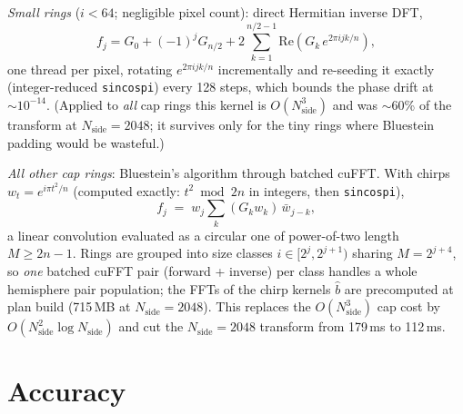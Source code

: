 \documentclass[11pt]{article}
\begin{document}
\emph{Small rings} ($i < 64$; negligible pixel count): direct Hermitian
inverse DFT,
\begin{equation}
f_j = G_0 + (-1)^j G_{n/2}
   + 2\sum_{k=1}^{n/2-1} \mathrm{Re}\!\left(G_k\, e^{2\pi i jk/n}\right),
\end{equation}
one thread per pixel, rotating $e^{2\pi i jk/n}$ incrementally and
re-seeding it exactly (integer-reduced \texttt{sincospi}) every 128 steps,
which bounds the phase drift at $\sim\!10^{-14}$.  (Applied to \emph{all}
cap rings this kernel is $O(N_\mathrm{side}^3)$ and was $\sim$60\% of the
transform at $N_\mathrm{side}=2048$; it survives only for the tiny rings
where Bluestein padding would be wasteful.)

\emph{All other cap rings}: Bluestein's algorithm through batched cuFFT.
With chirps $w_t = e^{i\pi t^2/n}$ (computed exactly: $t^2 \bmod 2n$ in
integers, then \texttt{sincospi}),
\begin{equation}
f_j \;=\; w_j \sum_{k} \left(G_k w_k\right)\, \bar w_{j-k},
\end{equation}
a linear convolution evaluated as a circular one of power-of-two length
$M \ge 2n-1$.  Rings are grouped into size classes
$i \in [2^j, 2^{j+1})$ sharing $M = 2^{j+4}$, so \emph{one} batched
cuFFT pair (forward + inverse) per class handles a whole hemisphere pair
population; the FFTs of the chirp kernels $\hat b$ are precomputed at plan
build (715\,MB at $N_\mathrm{side}=2048$).  This replaces the
$O(N_\mathrm{side}^3)$ cap cost by $O(N_\mathrm{side}^2 \log
N_\mathrm{side})$ and cut the $N_\mathrm{side}=2048$ transform from
179\,ms to 112\,ms.

\section{Accuracy}
\label{sec:accuracy}
\end{document}
